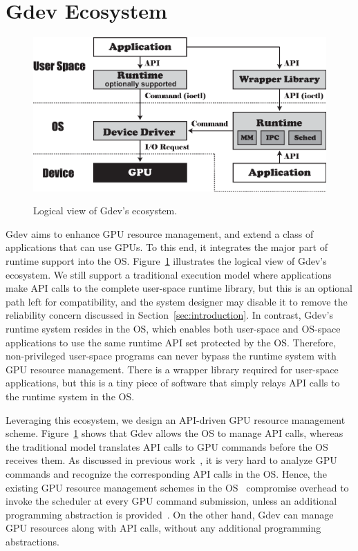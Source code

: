 \vspace{-0.25em}
\section{Gdev Ecosystem}
\label{sec:ecosystem}
\vspace{-0.25em}

\begin{figure}[t]
 \begin{center}
  \includegraphics[width=\hsize]{eps/gdev.eps}\\
  \vspace{-0.5em}
  \caption{Logical view of Gdev's ecosystem.}
  \label{fig:gdev}
 \end{center}
 \vspace{-1.5em}
\end{figure}

Gdev aims to enhance GPU resource management, and extend a class
of applications that can use GPUs.
To this end, it integrates the major part of runtime support into the OS.
Figure~\ref{fig:gdev} illustrates the logical view of Gdev's ecosystem.
We still support a traditional execution model where applications make
API calls to the complete user-space runtime library, but this is an
optional path left for compatibility, and the system designer may
disable it to remove the reliability concern discussed in
Section~\ref{sec:introduction}.
In contrast, Gdev's runtime system resides in the OS, which enables both
user-space and OS-space applications to use the same runtime API set
protected by the OS.
Therefore, non-privileged user-space programs can never bypass the
runtime system with GPU resource management.
There is a wrapper library required for user-space applications, but this is a
tiny piece of software that simply relays API calls to the runtime
system in the OS.

Leveraging this ecosystem, we design an API-driven GPU resource
management scheme.
Figure~\ref{fig:gdev} shows that Gdev allows the OS to manage
API calls, whereas the traditional model translates API calls to GPU
commands before the OS receives them.
As discussed in previous work~\cite{Kato_ATC11}, it is very hard to
analyze GPU commands and recognize the corresponding API calls in the
OS.
Hence, the existing GPU resource management schemes in the
OS~\cite{Bautin_MCNC08, Kato_ATC11} compromise overhead to invoke the
scheduler at every GPU command submission, unless an additional
programming abstraction is provided~\cite{Rossbach_SOSP11}.
On the other hand, Gdev can manage GPU resources along with API calls,
without any additional programming abstractions.

